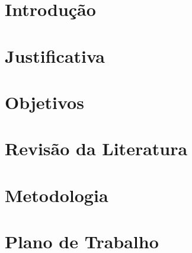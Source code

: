 \documentclass[12pt, a4paper]{article}
\numberwithin{table}{section}
\begin{document}
\section{Introdução}
\label{sec:introducao}


\section{Justificativa}
\label{sec:justificativa}

\section{Objetivos}
\label{sec:objetivos}

\section{Revisão da Literatura}
\label{sec:revisao}


\section{Metodologia}
\label{sec:metodologia}


\section{Plano de Trabalho}
\label{sec:plano}
\end{document}
